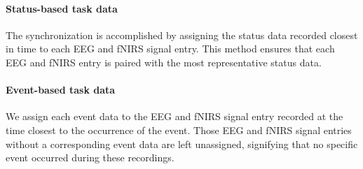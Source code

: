 \paragraph{Status-based task data} The synchronization is accomplished by assigning the status data recorded closest in time to each EEG and fNIRS signal entry. This method ensures that each EEG and fNIRS entry is paired with the most representative status data.

\paragraph{Event-based task data} We assign each event data to the EEG and fNIRS signal entry recorded at the time closest to the occurrence of the event. Those EEG and fNIRS signal entries without a corresponding event data are left unassigned, signifying that no specific event occurred during these recordings.
